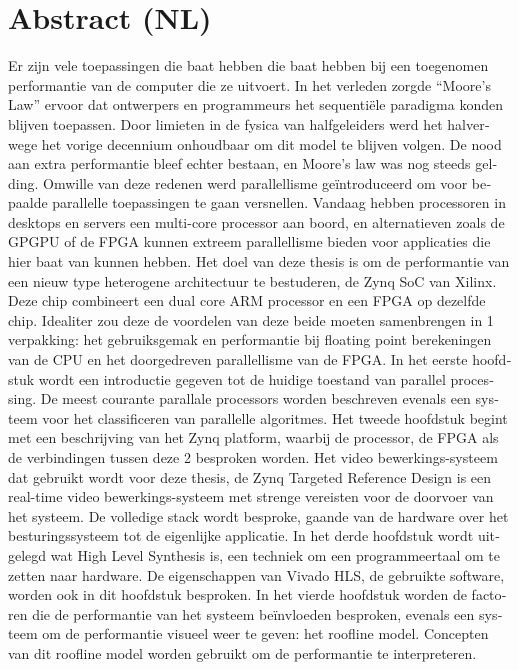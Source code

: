 
\chapter*{Abstract (NL)}

\begin{otherlanguage}{dutch}


Er zijn vele toepassingen die baat hebben die baat hebben bij een toegenomen performantie van de computer die ze uitvoert. In het verleden zorgde “Moore's Law” ervoor dat ontwerpers en programmeurs het sequentiële paradigma konden blijven toepassen. Door limieten in de fysica van halfgeleiders werd het halverwege het vorige decennium onhoudbaar om dit model te blijven volgen. De nood aan extra performantie bleef echter bestaan, en Moore's law was nog steeds gelding. Omwille van deze redenen werd parallellisme geïntroduceerd om voor bepaalde parallelle toepassingen te gaan versnellen. Vandaag hebben processoren in desktops en servers een multi-core processor aan boord, en alternatieven zoals de GPGPU of de FPGA kunnen extreem parallellisme bieden voor applicaties die hier baat van kunnen hebben.
Het doel van deze thesis is om de performantie van een nieuw type heterogene architectuur te bestuderen, de Zynq SoC van Xilinx. Deze chip combineert een dual core ARM processor en een FPGA op dezelfde chip. Idealiter zou deze de voordelen van deze beide moeten samenbrengen in 1 verpakking: het gebruiksgemak en performantie bij floating point berekeningen van de CPU en het doorgedreven parallellisme van de FPGA.
In het eerste hoofdstuk wordt een introductie gegeven tot de huidige toestand van parallel processing. De meest courante parallale processors worden beschreven evenals een systeem voor het classificeren van parallelle algoritmes. Het tweede hoofdstuk begint met een beschrijving van het Zynq platform, waarbij de processor, de FPGA als de verbindingen tussen deze 2 besproken worden. Het video bewerkings-systeem dat gebruikt wordt voor deze thesis, de Zynq Targeted Reference Design is een real-time video bewerkings-systeem met strenge vereisten voor de doorvoer van het systeem. De volledige stack wordt besproke, gaande van de hardware over het besturingssysteem tot de eigenlijke applicatie. In het derde hoofdstuk wordt uitgelegd wat High Level Synthesis is, een techniek om een programmeertaal om te zetten naar hardware. De eigenschappen van Vivado HLS, de gebruikte software, worden ook in dit hoofdstuk besproken. In het vierde hoofdstuk worden de factoren die de performantie van het systeem beïnvloeden besproken, evenals een systeem om de performantie visueel weer te geven:  het roofline model. Concepten van dit roofline model worden gebruikt om de performantie te interpreteren. 

\end{otherlanguage}